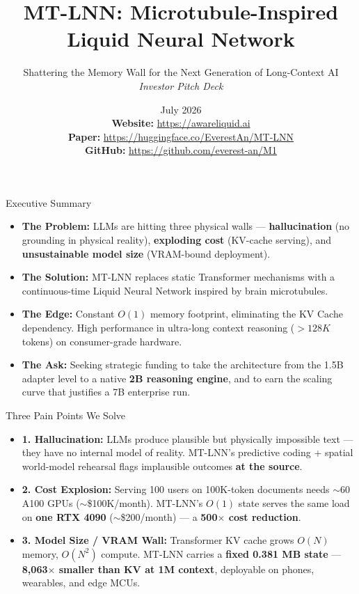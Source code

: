 \documentclass[aspectratio=169, 10pt]{beamer}
\title{MT-LNN: Microtubule-Inspired Liquid Neural Network}
\subtitle{Shattering the Memory Wall for the Next Generation of Long-Context AI \\ \textit{Investor Pitch Deck}}
\author{\Huge \aeonik{Awareness}}
\date{July 2026 \\[1em]
\footnotesize
\textbf{Website:} \url{https://awareliquid.ai} \\
\textbf{Paper:} \url{https://huggingface.co/EverestAn/MT-LNN} \\
\textbf{GitHub:} \url{https://github.com/everest-an/M1}
}
\begin{document}
\frame{\titlepage}

\begin{frame}{Executive Summary}
\begin{itemize}
    \item \textbf{The Problem:} LLMs are hitting three physical walls --- \textbf{hallucination} (no grounding in physical reality), \textbf{exploding cost} (KV-cache serving), and \textbf{unsustainable model size} (VRAM-bound deployment).
    \item \textbf{The Solution:} MT-LNN replaces static Transformer mechanisms with a continuous-time Liquid Neural Network inspired by brain microtubules.
    \item \textbf{The Edge:} Constant $O(1)$ memory footprint, eliminating the KV Cache dependency. High performance in ultra-long context reasoning ($>128K$ tokens) on consumer-grade hardware.
    \item \textbf{The Ask:} Seeking strategic funding to take the architecture from the 1.5B adapter level to a native \textbf{2B reasoning engine}, and to earn the scaling curve that justifies a 7B enterprise run.
\end{itemize}
\end{frame}

\begin{frame}{Three Pain Points We Solve}
\begin{itemize}
    \item \textbf{1. Hallucination:} LLMs produce plausible but physically impossible text --- they have no internal model of reality. MT-LNN's predictive coding + spatial world-model rehearsal flags implausible outcomes \textbf{at the source}.
    \item \textbf{2. Cost Explosion:} Serving 100 users on 100K-token documents needs $\sim$60 A100 GPUs ($\sim$\$100K/month). MT-LNN's $O(1)$ state serves the same load on \textbf{one RTX 4090} ($\sim$\$200/month) --- a \textbf{500$\times$ cost reduction}.
    \item \textbf{3. Model Size / VRAM Wall:} Transformer KV cache grows $O(N)$ memory, $O(N^2)$ compute. MT-LNN carries a \textbf{fixed 0.381 MB state} --- \textbf{8{,}063$\times$ smaller than KV at 1M context}, deployable on phones, wearables, and edge MCUs.
\end{itemize}
\end{frame}
\end{document}
